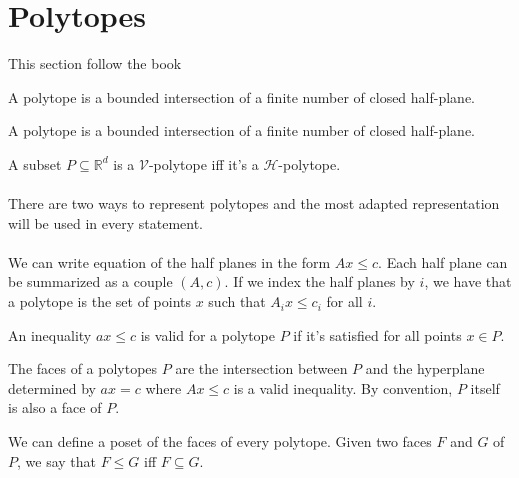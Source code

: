 \section{Polytopes}

This section follow the book \cite{polytopes}

\begin{definition}
  A polytope is a bounded intersection of a finite number of closed half-plane.
\end{definition}

\begin{definition}
  A polytope is a bounded intersection of a finite number of closed half-plane.
\end{definition}

\begin{theorem}
  A subset $P \subseteq \mathbb R^d$ is a $\mathcal V$-polytope iff it's a $\mathcal H$-polytope.
\end{theorem}

\paragraph{}
There are two ways to represent polytopes and the most adapted representation will be used in every statement.

\paragraph{}
We can write equation of the half planes in the form $Ax \le c$. Each half plane can be summarized as a couple $(A,c)$. If we index the half planes by $i$, we have that a polytope is the set of points $x$ such that $A_i x \le c_i$ for all $i$.

\begin{definition}
  An inequality $ax \le c$ is valid for a polytope $P$ if it's satisfied for all points $x \in P$.
\end{definition}

\begin{definition}
  The faces of a polytopes $P$ are the intersection between $P$ and the hyperplane determined by $ax = c$ where $Ax \le c$ is a valid inequality. By convention, $P$ itself is also a face of $P$.
\end{definition}

\begin{definition}
  We can define a poset of the faces of every polytope. Given two faces $F$ and $G$ of $P$, we say that $F \le G$ iff $F \subseteq G$.
\end{definition}

